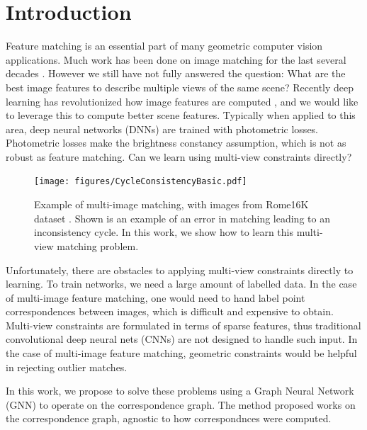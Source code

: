 \documentclass[10pt,twocolumn,letterpaper]{article}
\begin{document}
\section{Introduction}

Feature matching is an essential part of many geometric computer vision applications.
Much work has been done on image matching for the last several decades \cite{fischler1981random}.
However we still have not fully answered the question: What are the best image features to describe multiple views of the same scene?
Recently deep learning has revolutionized how image features are computed \cite{yi2016lift}, and we would like to leverage this to compute better scene features.
Typically when applied to this area, deep neural networks (DNNs) are trained with photometric losses.
Photometric losses make the brightness constancy assumption, which is not as robust as feature matching.
Can we learn using multi-view constraints directly?

\begin{figure}[t]
\begin{center}
  \texttt{[image: figures/CycleConsistencyBasic.pdf]}
\end{center}
  \caption{
    Example of multi-image matching, with images from Rome16K dataset \cite{li2010location}.
    Shown is an example of an error in matching leading to an inconsistency cycle.
    In this work, we show how to learn this multi-view matching problem.
  }
\label{fig:cycconsistex}
\label{fig:onecol}
\end{figure}


Unfortunately, there are obstacles to applying multi-view constraints directly to learning. 
To train networks, we need a large amount of labelled data.
In the case of multi-image feature matching, one would need to hand label point correspondences between images, which is difficult and expensive to obtain.
Multi-view constraints are formulated in terms of sparse features, thus traditional convolutional deep neural nets (CNNs) are not designed to handle such input.
In the case of multi-image feature matching, geometric constraints would be helpful in rejecting outlier matches.

In this work, we propose to solve these problems using a Graph Neural Network (GNN) to operate on the correspondence graph.
The method proposed works on the correspondence graph, agnostic to how correspondnces were computed.
\end{document}
